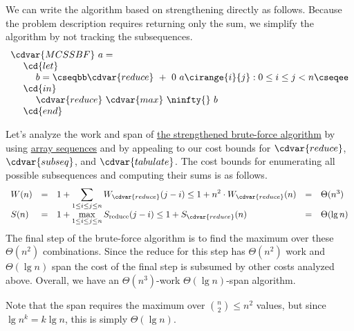 \begin{cluster}
\label{grp:alg:mcss::bf-alg::mcss-strong}

\begin{algorithm}
\label{alg:mcss::bf-alg::mcss-strong}

We can write the algorithm based on strengthening directly as follows.
Because the problem description requires returning only the sum, we
simplify the algorithm by not tracking the subsequences.
\[
\begin{array}{l}
\cdvar{MCSSBF}~a =
\\
~~~~\cd{let} 
\\
~~~~~~~~b = \cseqbb \cdvar{reduce}~+~0~a\cirange{i}{j}  : 0  \le i \le j < n \cseqee
\\
~~~~\cd{in}
\\
~~~~~~~~\cdvar{reduce}~\cdvar{max}~\ninfty{}~b
\\
~~~~\cd{end}
\end{array}
\]

\end{algorithm}
\end{cluster}

\begin{flex}
\label{grp:grm:mcss::cost-analysis}

\begin{gram}
\label{grm:mcss::cost-analysis}
Let's analyze the work and span of 
\href{alg:mcss::bf-alg::mcss-strong}{the strengthened brute-force algorithm} by using 
\href{sec:sequences::cost::arrays}{array sequences}
and by appealing to our cost bounds for
$\cdvar{reduce}$, $\cdvar{subseq}$, and $\cdvar{tabulate}$.
The cost bounds for enumerating all possible subsequences and
computing their sums is as follows.
\[
\begin{array}{lllll}
  W(n) & = & 1 + \displaystyle\sum_{1 \leq i\leq j\leq n} W_{\cdvar{reduce}}(j-i) \leq
           1 + n^2 \cdot W_{\cdvar{reduce}}(n) 
       & = & \Theta(n^3) 
\\
  S(n) & = & 1 + \displaystyle\max_{1 \leq i\leq j\leq n} S_{\textrm{reduce}}(j-i) \leq 
           1 + S_{\cdvar{reduce}}(n) 
       & = & \Theta(\lg n) 
\end{array}
\]
The final step of the brute-force algorithm is to find the maximum
over these $\Theta(n^2)$ combinations.
Since the reduce for this step has $\Theta(n^2)$ work and $\Theta(\lg n)$
span
 the cost of the final step is subsumed by other costs analyzed
above.  
Overall, we have an $\Theta(n^3)$-work $\Theta(\lg n)$-span algorithm.

\end{gram}

\begin{note}
\label{nt:mcss::span}
Note that the span requires the maximum over
$\binom{n}{2} \leq n^2$ values, 
but since $\lg n^k = k \lg n$, this is simply
$\Theta(\lg n)$.

\end{note}
\end{flex}


